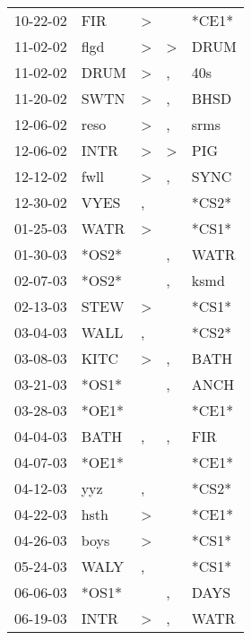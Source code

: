 \begin{supertabular}{lllll}
 10-22-02 &    FIR &     \textgreater &                  &  *CE1* \\
 11-02-02 &   flgd &     \textgreater &     \textgreater &   DRUM \\
 11-02-02 &   DRUM &     \textgreater &                , &    40s \\
 11-20-02 &   SWTN &     \textgreater &                , &   BHSD \\
 12-06-02 &   reso &     \textgreater &                , &   srms \\
 12-06-02 &   INTR &     \textgreater &     \textgreater &    PIG \\
 12-12-02 &   fwll &     \textgreater &                , &   SYNC \\
 12-30-02 &   VYES &                , &                  &  *CS2* \\
 01-25-03 &   WATR &     \textgreater &                  &  *CS1* \\
 01-30-03 &  *OS2* &                  &                , &   WATR \\
 02-07-03 &  *OS2* &                  &                , &   ksmd \\
 02-13-03 &   STEW &     \textgreater &                  &  *CS1* \\
 03-04-03 &   WALL &                , &                  &  *CS2* \\
 03-08-03 &   KITC &     \textgreater &                , &   BATH \\
 03-21-03 &  *OS1* &                  &                , &   ANCH \\
 03-28-03 &  *OE1* &                  &                  &  *CE1* \\
 04-04-03 &   BATH &                , &                , &    FIR \\
 04-07-03 &  *OE1* &                  &                  &  *CE1* \\
 04-12-03 &    yyz &                , &                  &  *CS2* \\
 04-22-03 &   hsth &     \textgreater &                  &  *CE1* \\
 04-26-03 &   boys &     \textgreater &                  &  *CS1* \\
 05-24-03 &   WALY &                , &                  &  *CS1* \\
 06-06-03 &  *OS1* &                  &                , &   DAYS \\
 06-19-03 &   INTR &     \textgreater &                , &   WATR \\

\end{supertabular}
